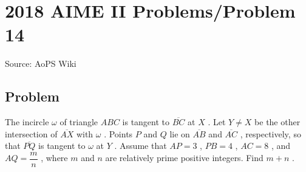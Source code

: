 \documentclass[12pt]{article}
\begin{document}
\section*{{2018 AIME II Problems/Problem 14}}
Source: AoPS Wiki

\subsection*{Problem}
The incircle $\omega$ of triangle $ABC$ is tangent to $\overline{BC}$ at $X$ . Let $Y \neq X$ be the other intersection of $\overline{AX}$ with $\omega$ . Points $P$ and $Q$ lie on $\overline{AB}$ and $\overline{AC}$ , respectively, so that $\overline{PQ}$ is tangent to $\omega$ at $Y$ . Assume that $AP = 3$ , $PB = 4$ , $AC = 8$ , and $AQ = \dfrac{m}{n}$ , where $m$ and $n$ are relatively prime positive integers. Find $m+n$ .
\end{document}
